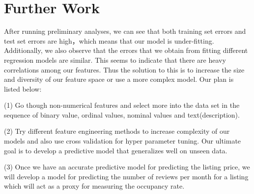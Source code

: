 \documentclass[12pt]{article}
\begin{document}
\section*{Further Work}
\noindent After running preliminary analyses, we can see that both
training set errors and test set errors are high，which means that our model is under-fitting. Additionally, we also observe that the errors that we obtain from fitting different regression models are similar. This seems to indicate that there are heavy correlations among our features. Thus the solution to this is to increase the size and diversity of our feature space or use a more complex model. Our plan is listed below:

\noindent (1) Go though non-numerical features and select more into the data set in the sequence of binary value, ordinal values, nominal values and text(description). 

\noindent (2) Try different feature engineering methods to increase complexity
of our models and also use cross validation for hyper parameter tuning. Our ultimate goal is to develop a predictive model that generalizes well on unseen data. 

\noindent (3) Once we have an accurate predictive model for predicting the listing price, we will develop a model for predicting the number of reviews per month for a listing which will act as a proxy for measuring the occupancy rate.
\end{document}
